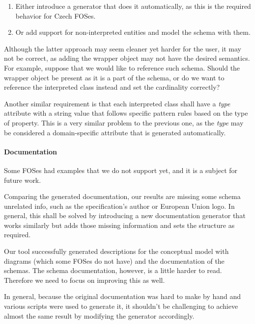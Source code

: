 \begin{enumerate}
    \item Either introduce a generator that does it automatically, as this is the required behavior for Czech FOSes.
    \item Or add support for non-interpreted entities and model the schema with them.
\end{enumerate}

Although the latter approach may seem cleaner yet harder for the user, it may not be correct, as adding the wrapper object may not have the desired semantics. For example, suppose that we would like to reference such schema. Should the wrapper object be present as it is a part of the schema, or do we want to reference the interpreted class instead and set the cardinality correctly?

\smallskip

Another similar requirement is that each interpreted class shall have a \textit{type} attribute with a string value that follows specific pattern rules based on the type of property. This is a very similar problem to the previous one, as the \textit{type} may be considered a domain-specific attribute that is generated automatically.

\paragraph{Documentation} Some FOSes had examples that we do not support yet, and it is a subject for future work.

Comparing the generated documentation, our results are missing some schema unrelated info, such as the specification's author or European Union logo. In general, this shall be solved by introducing a new documentation generator that works similarly but adds those missing information and sets the structure as required.

Our tool successfully generated descriptions for the conceptual model with diagrams (which some FOSes do not have) and the documentation of the schemas. The schema documentation, however, is a little harder to read. Therefore we need to focus on improving this as well.

In general, because the original documentation was hard to make by hand and various scripts were used to generate it, it shouldn't be challenging to achieve almost the same result by modifying the generator accordingly.
